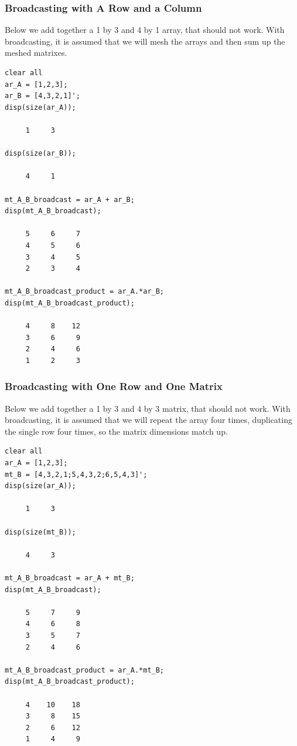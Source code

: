 \documentclass[
]{book}
\begin{document}
\hypertarget{broadcasting-with-a-row-and-a-column}{%
\subsubsection{Broadcasting with A Row and a Column}\label{broadcasting-with-a-row-and-a-column}}

Below we add together a 1 by 3 and 4 by 1 array, that should not work.
With broadcasting, it is assumed that we will mesh the arrays and then
sum up the meshed matrixes.

\begin{verbatim}
clear all
ar_A = [1,2,3];
ar_B = [4,3,2,1]';
disp(size(ar_A));

     1     3

disp(size(ar_B));

     4     1

mt_A_B_broadcast = ar_A + ar_B;
disp(mt_A_B_broadcast);

     5     6     7
     4     5     6
     3     4     5
     2     3     4

mt_A_B_broadcast_product = ar_A.*ar_B;
disp(mt_A_B_broadcast_product);

     4     8    12
     3     6     9
     2     4     6
     1     2     3
\end{verbatim}

\hypertarget{broadcasting-with-one-row-and-one-matrix}{%
\subsubsection{Broadcasting with One Row and One Matrix}\label{broadcasting-with-one-row-and-one-matrix}}

Below we add together a 1 by 3 and 4 by 3 matrix, that should not work.
With broadcasting, it is assumed that we will repeat the array four
times, duplicating the single row four times, so the matrix dimensions
match up.

\begin{verbatim}
clear all
ar_A = [1,2,3];
mt_B = [4,3,2,1;5,4,3,2;6,5,4,3]';
disp(size(ar_A));

     1     3

disp(size(mt_B));

     4     3

mt_A_B_broadcast = ar_A + mt_B;
disp(mt_A_B_broadcast);

     5     7     9
     4     6     8
     3     5     7
     2     4     6

mt_A_B_broadcast_product = ar_A.*mt_B;
disp(mt_A_B_broadcast_product);

     4    10    18
     3     8    15
     2     6    12
     1     4     9
\end{verbatim}
\end{document}
